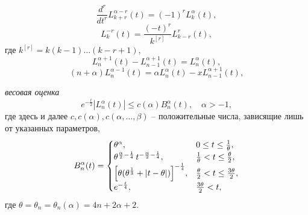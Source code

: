 \begin{equation} \label{laplas-2.8}
\frac{d^r}{dt^r} L_{k+r}^{\alpha-r}(t) = (-1)^{r} L_{k}^{\alpha}(t),
\end{equation}
\begin{equation}\label{laplas-2.9}
L_{k}^{-r}(t) = \frac{(-t)^{r}}{k^{[r]}} L_{k-r}^{r}(t),
\end{equation}
где $k^{[r]} = k(k-1)\ldots(k-r+1)$,
\begin{equation}\label{laplas-2.10}
L_n^{\alpha+1}(t)-L_{n-1}^{\alpha+1}(t)=L_n^\alpha(t),
     \end{equation}
 \begin{equation}\label{laplas-2.11}
(n+\alpha)L_n^{\alpha-1}(t)=\alpha L_n^\alpha(t)-
xL_{n-1}^{\alpha+1}(t),
\end{equation}







\textit{весовая оценка} \cite{AskeyWaiger}
\begin{equation}\label{laplas-2.12}
e^{-\frac{t}{2}}|L_n^\alpha(t)| \le c(\alpha) B_n^\alpha(t), \quad \alpha>-1,
\end{equation}
где здесь и далее $c,c(\alpha),c(\alpha,\ldots,\beta)$ -- положительные числа, зависящие лишь от указанных параметров,
\begin{equation*}
B_n^\alpha(t)=
\begin{cases}
\theta^\alpha, &0 \le t \le \frac{1}{\theta},\\
\theta^{\frac{\alpha}{2} - \frac{1}{4}}\,t^{-\frac{\alpha}{2} - \frac{1}{4}}, & \frac{1}{\theta} < t \le \frac{\theta}{2},\\
\Bigl[
\theta(\theta^{\frac{1}{3}}+|t-\theta|)
\Bigr]^{-\frac{1}{4}}, & \frac{\theta}{2} < t \le \frac{3\theta}{2},\\
e^{-\frac{t}{4}}, &\frac{3\theta}{2}< t,
\end{cases}
\end{equation*}
где $\theta=\theta_n=\theta_n(\alpha)=4n+2\alpha+2$.

